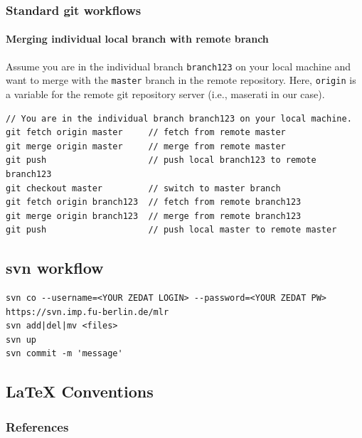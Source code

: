 \subsubsection{Standard git workflows}

\paragraph{Merging individual local branch with remote branch}

Assume you are in the individual branch \verb+branch123+ on your local machine and want to merge 
with the \verb+master+ branch in the remote repository. Here, \verb+origin+ is a variable
for the remote git repository server (i.e., maserati in our case).
\begin{verbatim}
// You are in the individual branch branch123 on your local machine.
git fetch origin master     // fetch from remote master
git merge origin master     // merge from remote master
git push                    // push local branch123 to remote branch123
git checkout master         // switch to master branch
git fetch origin branch123  // fetch from remote branch123
git merge origin branch123  // merge from remote branch123
git push                    // push local master to remote master
\end{verbatim}






\subsection{svn workflow}

\begin{code}
\begin{verbatim}
svn co --username=<YOUR ZEDAT LOGIN> --password=<YOUR ZEDAT PW> https://svn.imp.fu-berlin.de/mlr
svn add|del|mv <files>
svn up
svn commit -m 'message'
\end{verbatim}
\end{code}



\subsection{LaTeX Conventions}

\subsubsection{References}


